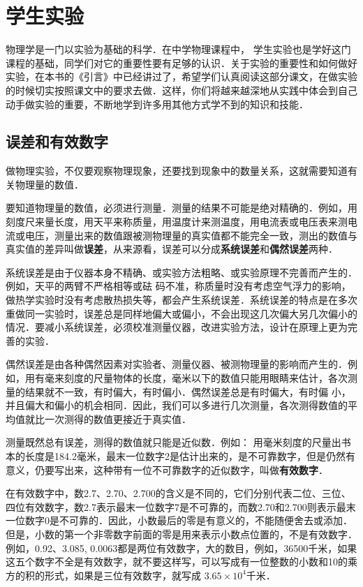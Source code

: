 \chapter{学生实验}

物理学是一门以实验为基础的科学．在中学物理课程中，
学生实验也是学好这门课程的基础，同学们对它的重要性要有足够的认识．关于实验的重要性和如何做好实验，在本书的《引言》中已经讲过了，希望学们认真阅读这部分课文，在做实验的时候切实按照课文中的要求去做．这样，你们将越来越深地从实践中体会到自己动手做实验的重要，不断地学到许多用其他方式学不到的知识和技能．

\section*{误差和有效数字}

做物理实验，不仅要观察物理现象，还要找到现象中的数量关系，这就需要知道有关物理量的数值．

要知道物理量的数值，必须进行测量．测量的结果不可能是绝对精确的．例如，用刻度尺来量长度，用天平来称质量，用温度计来测温度，用电流表或电压表来测电流或电压，测量出来的数值跟被测物理量的真实值都不能完全一致，测出的数值与真实值的差异叫做\textbf{误差}，从来源看，误差可以分成\textbf{系统误差}和\textbf{偶然误差}两种．

系统误差是由于仪器本身不精确、或实验方法粗略、或实验原理不完善而产生的．例如，天平的两臂不严格相等或砝
码不准，称质量时没有考虑空气浮力的影响，做热学实验时没有考虑散热损失等，都会产生系统误差．系统误差的特点是在多次重做同一实验时，误差总是同样地偏大或偏小，不会出现这几次偏大另几次偏小的情况．要减小系统误差，必须校准测量仪器，改进实验方法，设计在原理上更为完善的实验．

偶然误差是由各种偶然因素对实验者、测量仪器、被测物理量的影响而产生的．例如，用有毫来刻度的尺量物体的长度，毫米以下的数值只能用眼睛来估计，各次测量的结果就不一致，有时偏大，有时偏小．偶然误差总是有时偏大，有时偏
小，并且偏大和偏小的机会相同．因此，我们可以多进行几次测量，各次测得数值的平均值就比一次测得的数值更接近于真实值．

测量既然总有误差，测得的数值就只能是近似数．例如：
用毫米刻度的尺量出书本的长度是184.2毫米，最末一位数字2是估计出来的，是不可靠数字，但是仍然有意义，仍要写出来，这种带有一位不可靠数字的近似数字，叫做\textbf{有效数字}．

在有效数字中，数2.7、2.70、2.700的含义是不同的，它们分别代表二位、三位、四位有效数字，数2.7表示最末一位数字7是不可靠的，而数2.70和2.700则表示最末一位数字0是不可靠的．因此，小数最后的零是有意义的，不能随便舍去或添加．但是，小数的第一个非零数字前面的零是用来表示小数点位置的，不是有效数字．例如，0.92、3.085, 0.0063都是两位有效数字，大的数目，例如，36500千米，如果这五个数字不全是有效数字，就不要这样写，可以写成有一位整数的小数和10的乘方的积的形式，如果是三位有效数字，就写成
$3.65\times 10^4$千米．

